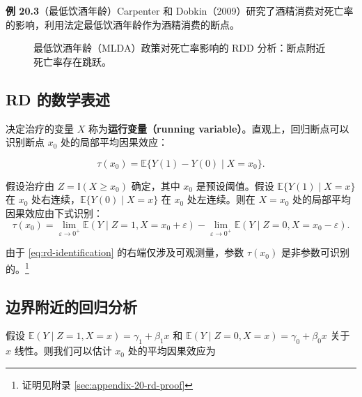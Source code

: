 \textbf{例 20.3}（最低饮酒年龄）Carpenter 和 Dobkin（2009）研究了酒精消费对死亡率的影响，利用法定最低饮酒年龄作为酒精消费的断点。

\begin{figure}[ht]
\centering
{}
\caption{最低饮酒年龄（MLDA）政策对死亡率影响的 RDD 分析：断点附近死亡率存在跳跃。}
\label{fig:mlda}
\end{figure}

\subsection{RD 的数学表述}\label{sec:20-rd-math}

决定治疗的变量 $X$ 称为\textbf{运行变量（running variable）}。直观上，回归断点可以识别断点 $x_0$ 处的局部平均因果效应：

\begin{equation}
\tau(x_0) = \mathbb{E}\{Y(1) - Y(0) \mid X = x_0\}.
\tag{20.7}
\label{eq:rd-local-ace}
\end{equation}

\begin{Theorem}[RD 识别定理]\label{th:20-rd-identification}
假设治疗由 $Z = \mathbb{I}(X \geq x_0)$ 确定，其中 $x_0$ 是预设阈值。假设 $\mathbb{E}\{Y(1) \mid X=x\}$ 在 $x_0$ 处右连续，$\mathbb{E}\{Y(0) \mid X=x\}$ 在 $x_0$ 处左连续。则在 $X=x_0$ 处的局部平均因果效应由下式识别：
\begin{equation}
\tau(x_0) = \lim_{\varepsilon \to 0^+} \mathbb{E}(Y \mid Z=1, X=x_0+\varepsilon) - \lim_{\varepsilon \to 0^+} \mathbb{E}(Y \mid Z=0, X=x_0-\varepsilon).
\tag{20.8}
\label{eq:rd-identification}
\end{equation}
\end{Theorem}

由于 \cref{eq:rd-identification} 的右端仅涉及可观测量，参数 $\tau(x_0)$ 是非参数可识别的。\footnote{证明见附录 \cref{sec:appendix-20-rd-proof}}

\subsection{边界附近的回归分析}\label{sec:20-rd-regression}

假设 $\mathbb{E}(Y \mid Z=1, X=x) = \gamma_1 + \beta_1 x$ 和 $\mathbb{E}(Y \mid Z=0, X=x) = \gamma_0 + \beta_0 x$ 关于 $x$ 线性。则我们可以估计 $x_0$ 处的平均因果效应为

